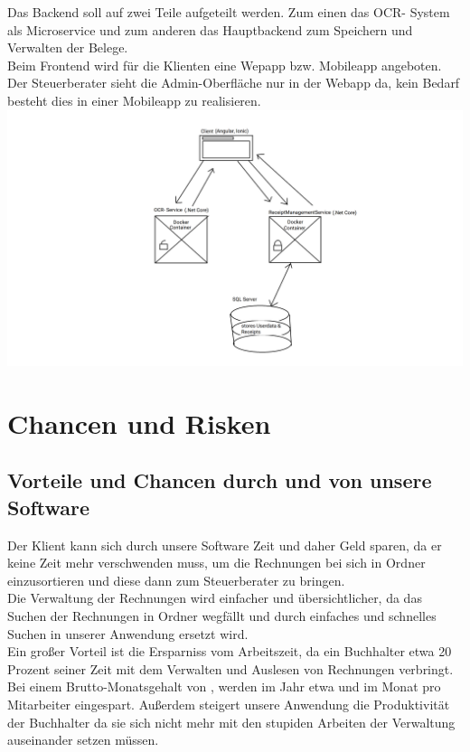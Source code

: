 \documentclass[12pt]{article}
\theoremstyle{definition}
\begin{document}
Das Backend soll auf zwei Teile aufgeteilt werden. Zum einen das OCR- System als Microservice und zum anderen das Hauptbackend zum Speichern und Verwalten der Belege.\\

Beim Frontend wird für die Klienten eine Wepapp bzw. Mobileapp angeboten. Der Steuerberater sieht die Admin-Oberfläche nur in der Webapp da, kein Bedarf besteht dies in einer Mobileapp zu realisieren.\\

\includegraphics[scale=0.35]{SystemConcept}
\pagebreak


\section{Chancen und Risken}

\subsection{Vorteile und Chancen durch und von unsere Software}

Der Klient kann sich durch unsere Software Zeit und daher Geld sparen, da er keine Zeit mehr verschwenden muss, um die Rechnungen bei sich in Ordner einzusortieren und diese dann zum Steuerberater zu bringen.\\

Die Verwaltung der Rechnungen wird einfacher und übersichtlicher, da das Suchen der Rechnungen in Ordner wegfällt und durch einfaches und schnelles Suchen in unserer Anwendung ersetzt wird.\\


Ein großer Vorteil ist die Ersparniss vom Arbeitszeit, da ein Buchhalter etwa 20 Prozent seiner Zeit mit dem Verwalten und Auslesen von Rechnungen verbringt. Bei einem Brutto-Monatsgehalt von , werden im Jahr etwa  und im Monat  pro Mitarbeiter eingespart. Außerdem steigert unsere Anwendung die Produktivität der Buchhalter da sie sich nicht mehr mit den stupiden Arbeiten der Verwaltung auseinander setzen müssen.\\
\end{document}

